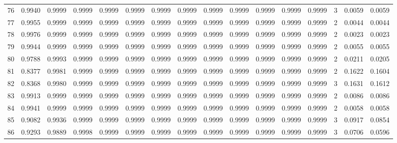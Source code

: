 \begin{tabular}{lrrrrrrrrrrrrrrr}
76  &      0.9940 &  0.9999 &  0.9999 &  0.9999 &  0.9999 &  0.9999 &  0.9999 &  0.9999 &  0.9999 &  0.9999 &   0.9999 &     0.9999 &      3 &                    0.0059 &                     0.0059 \\
77  &      0.9955 &  0.9999 &  0.9999 &  0.9999 &  0.9999 &  0.9999 &  0.9999 &  0.9999 &  0.9999 &  0.9999 &   0.9999 &     0.9999 &      2 &                    0.0044 &                     0.0044 \\
78  &      0.9976 &  0.9999 &  0.9999 &  0.9999 &  0.9999 &  0.9999 &  0.9999 &  0.9999 &  0.9999 &  0.9999 &   0.9999 &     0.9999 &      2 &                    0.0023 &                     0.0023 \\
79  &      0.9944 &  0.9999 &  0.9999 &  0.9999 &  0.9999 &  0.9999 &  0.9999 &  0.9999 &  0.9999 &  0.9999 &   0.9999 &     0.9999 &      2 &                    0.0055 &                     0.0055 \\
80  &      0.9788 &  0.9993 &  0.9999 &  0.9999 &  0.9999 &  0.9999 &  0.9999 &  0.9999 &  0.9999 &  0.9999 &   0.9999 &     0.9999 &      2 &                    0.0211 &                     0.0205 \\
81  &      0.8377 &  0.9981 &  0.9999 &  0.9999 &  0.9999 &  0.9999 &  0.9999 &  0.9999 &  0.9999 &  0.9999 &   0.9999 &     0.9999 &      2 &                    0.1622 &                     0.1604 \\
82  &      0.8368 &  0.9980 &  0.9999 &  0.9999 &  0.9999 &  0.9999 &  0.9999 &  0.9999 &  0.9999 &  0.9999 &   0.9999 &     0.9999 &      3 &                    0.1631 &                     0.1612 \\
83  &      0.9913 &  0.9999 &  0.9999 &  0.9999 &  0.9999 &  0.9999 &  0.9999 &  0.9999 &  0.9999 &  0.9999 &   0.9999 &     0.9999 &      2 &                    0.0086 &                     0.0086 \\
84  &      0.9941 &  0.9999 &  0.9999 &  0.9999 &  0.9999 &  0.9999 &  0.9999 &  0.9999 &  0.9999 &  0.9999 &   0.9999 &     0.9999 &      2 &                    0.0058 &                     0.0058 \\
85  &      0.9082 &  0.9936 &  0.9999 &  0.9999 &  0.9999 &  0.9999 &  0.9999 &  0.9999 &  0.9999 &  0.9999 &   0.9999 &     0.9999 &      3 &                    0.0917 &                     0.0854 \\
86  &      0.9293 &  0.9889 &  0.9998 &  0.9999 &  0.9999 &  0.9999 &  0.9999 &  0.9999 &  0.9999 &  0.9999 &   0.9999 &     0.9999 &      3 &                    0.0706 &                     0.0596 \\

\end{tabular}
